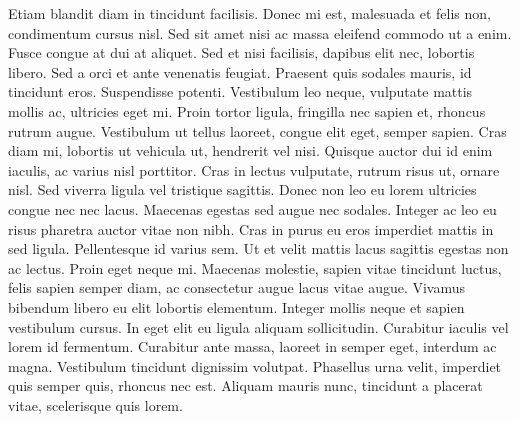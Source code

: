 \documentclass[a4paper, 12pt, twoside]{book}
\begin{document}

Etiam blandit diam in tincidunt facilisis. Donec mi est, malesuada et felis non, condimentum cursus nisl. Sed sit amet nisi ac massa eleifend commodo ut a enim. Fusce congue at dui at aliquet. Sed et nisi facilisis, dapibus elit nec, lobortis libero. Sed a orci et ante venenatis feugiat. Praesent quis sodales mauris, id tincidunt eros. Suspendisse potenti. Vestibulum leo neque, vulputate mattis mollis ac, ultricies eget mi. Proin tortor ligula, fringilla nec sapien et, rhoncus rutrum augue. Vestibulum ut tellus laoreet, congue elit eget, semper sapien. Cras diam mi, lobortis ut vehicula ut, hendrerit vel nisi. Quisque auctor dui id enim iaculis, ac varius nisl porttitor. Cras in lectus vulputate, rutrum risus ut, ornare nisl. Sed viverra ligula vel tristique sagittis. Donec non leo eu lorem ultricies congue nec nec lacus. Maecenas egestas sed augue nec sodales. Integer ac leo eu risus pharetra auctor vitae non nibh. Cras in purus eu eros imperdiet mattis in sed ligula. Pellentesque id varius sem. Ut et velit mattis lacus sagittis egestas non ac lectus. Proin eget neque mi. Maecenas molestie, sapien vitae tincidunt luctus, felis sapien semper diam, ac consectetur augue lacus vitae augue. Vivamus bibendum libero eu elit lobortis elementum. Integer mollis neque et sapien vestibulum cursus. In eget elit eu ligula aliquam sollicitudin. Curabitur iaculis vel lorem id fermentum. Curabitur ante massa, laoreet in semper eget, interdum ac magna. Vestibulum tincidunt dignissim volutpat. Phasellus urna velit, imperdiet quis semper quis, rhoncus nec est. Aliquam mauris nunc, tincidunt a placerat vitae, scelerisque quis lorem.

\end{document}
